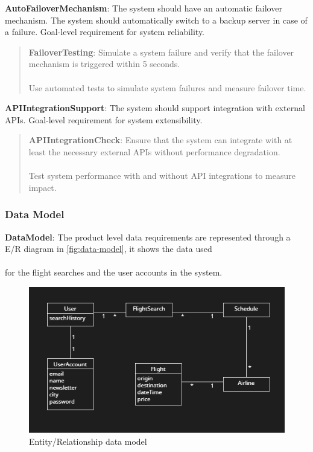 \textbf{AutoFailoverMechanism}: The system should have an automatic failover mechanism. The system should automatically switch to a backup server in case of a failure. Goal-level requirement for system reliability.
\begin{quote}
    \textbf{FailoverTesting}: Simulate a system failure and verify that the failover mechanism is triggered within 5 seconds. \\ \\
    Use automated tests to simulate system failures and measure failover time.
\end{quote}
\textbf{APIIntegrationSupport}: The system should support integration with external APIs. Goal-level requirement for system extensibility.
\begin{quote}
    \textbf{APIIntegrationCheck}: Ensure that the system can integrate with at least the necessary external APIs without performance degradation. \\ \\
    Test system performance with and without API integrations to measure impact.
\end{quote}

\subsubsection{Data Model}
\textbf{DataModel}: The product level data requirements are represented through a E/R diagram in \autoref{fig:data-model}, it shows the data used \\ \\
for the flight searches and the user accounts in the system.

\begin{figure}[H]
    \includegraphics[width=1\textwidth]{resources/dataRelations.PNG}
    \caption{Entity/Relationship data model}
    \label{fig:data-model}
\end{figure}

